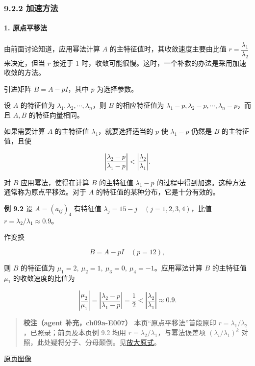 \documentclass[
  10pt,
  fontset=fandol]{ctexart}
\begin{document}
\subsubsection{9.2.2 加速方法}\label{ux52a0ux901fux65b9ux6cd5}

\paragraph{1. 原点平移法}\label{ux539fux70b9ux5e73ux79fbux6cd5}

由前面讨论知道，应用幂法计算 \(A\) 的主特征值时，其收敛速度主要由比值 \(r=\dfrac{\lambda_1}{\lambda_2}\) 来决定，但当 \(r\) 接近于 1 时，收敛可能很慢。这时，一个补救的办法是采用加速收敛的方法。

引进矩阵 \(B=A-pI\)，其中 \(p\) 为选择参数。

设 \(A\) 的特征值为 \(\lambda_1,\lambda_2,\cdots,\lambda_n\)，则 \(B\) 的相应特征值为 \(\lambda_1-p,\lambda_2-p,\cdots,\lambda_n-p\)，而且 \(A,B\) 的特征向量相同。

如果需要计算 \(A\) 的主特征值 \(\lambda_1\)，就要选择适当的 \(p\) 使 \(\lambda_1-p\) 仍然是 \(B\) 的主特征值，且使

\[
\left|\frac{\lambda_2-p}{\lambda_1-p}\right|<\left|\frac{\lambda_2}{\lambda_1}\right|.
\]

对 \(B\) 应用幂法，使得在计算 \(B\) 的主特征值 \(\lambda_1-p\) 的过程中得到加速。这种方法通常称为原点平移法。对于 \(A\) 的特征值的某种分布，它是十分有效的。

\textbf{例 9.2} 设 \(A=(a_{ij})_4\) 有特征值 \(\lambda_j=15-j\quad(j=1,2,3,4)\)，比值 \(r=\lambda_2/\lambda_1\approx0.9\)。

作变换

\[
B=A-pI\quad(p=12),
\]

则 \(B\) 的特征值为 \(\mu_1=2,\ \mu_2=1,\ \mu_3=0,\ \mu_4=-1\)。应用幂法计算 \(B\) 的主特征值 \(\mu_1\) 的收敛速度的比值为

\[
\left|\frac{\mu_2}{\mu_1}\right|=\left|\frac{\lambda_2-p}{\lambda_1-p}\right|=\frac12<\left|\frac{\lambda_2}{\lambda_1}\right|\approx0.9.
\]

\begin{quote}
\textbf{校注（agent 补充，ch09a-E007）} 本页``原点平移法''首段原印 \(r=\lambda_1/\lambda_2\)，已照录；前页及本页例 9.2 均用 \(r=\lambda_2/\lambda_1\)，与幂法误差项 \((\lambda_i/\lambda_1)^k\) 对照，此处疑将分子、分母颠倒。见\href{../assets/ch09a/review-p238-ratio.png}{放大原式}。
\end{quote}

\href{../../source-images/pdf-239.jpeg}{原页图像}
\end{document}
